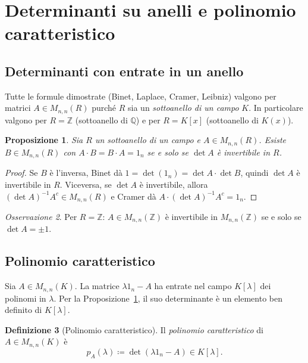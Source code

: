 \documentclass[11pt, a4paper]{book}
\theoremstyle{definition}
\newtheorem{definizione}{Definizione}[section]
\theoremstyle{plain}
\newtheorem{proposizione}[definizione]{Proposizione}
\theoremstyle{remark}
\newtheorem{osservazione}[definizione]{Osservazione}
\newcommand{\Z}{\mathbb{Z}}
\newcommand{\Q}{\mathbb{Q}}
\begin{document}
\section{Determinanti su anelli e polinomio caratteristico}
\label{sec:det-anello-polcar}

\subsection{Determinanti con entrate in un anello}

Tutte le formule dimostrate (Binet, Laplace, Cramer, Leibniz) valgono per matrici $A \in M_{n,n}(R)$ purché $R$ sia un \emph{sottoanello di un campo} $K$. In particolare valgono per $R = \Z$ (sottoanello di $\Q$) e per $R = K[x]$ (sottoanello di $K(x)$).

\begin{proposizione}
\label{prop:invertibile-anello}
Sia $R$ un sottoanello di un campo e $A \in M_{n,n}(R)$. Esiste $B \in M_{n,n}(R)$ con $A\cdot B = B\cdot A = 1_n$ se e solo se $\det A$ è invertibile in $R$.
\end{proposizione}

\begin{proof}
Se $B$ è l'inversa, Binet dà $1 = \det(1_n) = \det A \cdot \det B$, quindi $\det A$ è invertibile in $R$. Viceversa, se $\det A$ è invertibile, allora $(\det A)^{-1} A^c \in M_{n,n}(R)$ e Cramer dà $A\cdot (\det A)^{-1}A^c = 1_n$.
\end{proof}

\begin{osservazione}
Per $R=\Z$: $A \in M_{n,n}(\Z)$ è invertibile in $M_{n,n}(\Z)$ se e solo se $\det A = \pm 1$.
\end{osservazione}

\subsection{Polinomio caratteristico}

Sia $A \in M_{n,n}(K)$. La matrice $\lambda 1_n - A$ ha entrate nel campo $K[\lambda]$ dei polinomi in $\lambda$. Per la Proposizione~\ref{prop:invertibile-anello}, il suo determinante è un elemento ben definito di $K[\lambda]$.

\begin{defbox}
\begin{definizione}[Polinomio caratteristico]
Il \emph{polinomio caratteristico} di $A \in M_{n,n}(K)$ è
\[
  p_A(\lambda) \coloneqq \det(\lambda 1_n - A) \in K[\lambda].
\]
\end{definizione}
\end{defbox}
\end{document}
